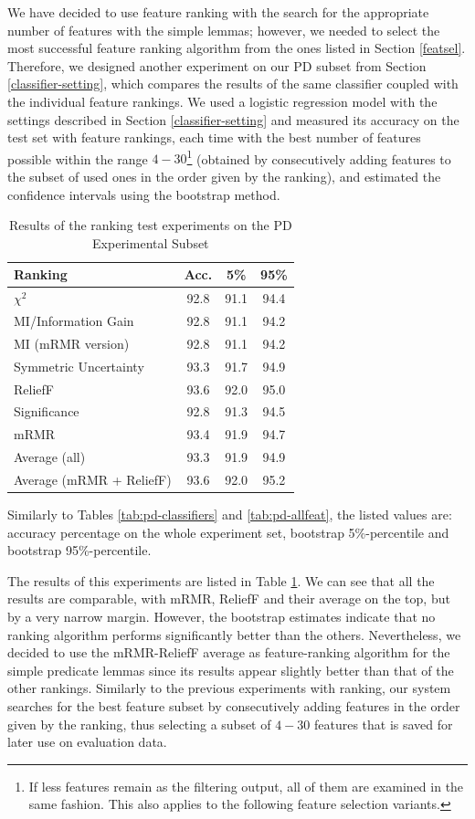 \documentclass[12pt,notitlepage]{report}
\begin{document}
We have decided to use feature ranking with the search for the appropriate number of features with the simple lemmas; however, we needed to select the most successful feature ranking algorithm from the ones listed in Section \ref{featsel}. Therefore, we designed another experiment on our PD subset from Section \ref{classifier-setting}, which compares the results of the same classifier coupled with the individual feature rankings. We used a logistic regression model with the settings described in Section \ref{classifier-setting} and measured its accuracy on the test set with feature rankings, each time with the best number of features possible within the range $4-30$\footnote{If less features remain as the filtering output, all of them are examined in the same fashion. This also applies to the following feature selection variants.} (obtained by consecutively adding features to the subset of used ones in the order given by the ranking), and estimated the confidence intervals using the bootstrap method. 

\begin{table}[htpb]
\caption{Results of the ranking test experiments on the PD Experimental Subset}\label{tab:ranker-test}\footnotesize
\begin{center}
\begin{tabular}{|l|c|c|c|}\hline
\bf Ranking & \bf Acc. & \bf 5\% & \bf 95\% \\\hline
$\chi^2$ & 92.8 & 91.1 & 94.4 \\
MI/Information Gain & 92.8 & 91.1 & 94.2 \\
MI (mRMR version) & 92.8 & 91.1 & 94.2 \\
Symmetric Uncertainty & 93.3 & 91.7 & 94.9 \\
ReliefF & 93.6 & 92.0 & 95.0 \\
Significance & 92.8 & 91.3 & 94.5 \\
mRMR & 93.4 & 91.9 & 94.7 \\
Average (all) & 93.3 & 91.9 & 94.9 \\
Average (mRMR + ReliefF) & 93.6 & 92.0 & 95.2 \\\hline
\end{tabular}
\end{center}
Similarly to Tables \ref{tab:pd-classifiers} and \ref{tab:pd-allfeat}, the listed values are: accuracy percentage on the whole experiment set, bootstrap 5\%-percentile and bootstrap 95\%-percentile. 
\end{table}

The results of this experiments are listed in Table \ref{tab:ranker-test}. We can see that all the results are comparable, with mRMR, ReliefF and their average on the top, but by a very narrow margin. However, the bootstrap estimates indicate that no ranking algorithm performs significantly better than the others. Nevertheless, we decided to use the mRMR-ReliefF average as feature-ranking algorithm for the simple predicate lemmas since its results appear slightly better than that of the other rankings. Similarly to the previous experiments with ranking, our system searches for the best feature subset by consecutively adding features in the order given by the ranking, thus selecting a subset of $4-30$ features that is saved for later use on evaluation data.
\end{document}
